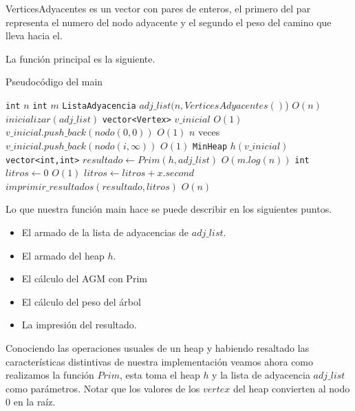 VerticesAdyacentes es un vector con pares de enteros, el primero del par representa el numero del nodo adyacente y el segundo el peso del camino que lleva hacia el.

La función principal es la siguiente.

\begin{algorithm}[H]
  \begin{algorithmic}[1]
  \caption{Pseudocódigo del main}
  \label{algo:2-1}
    	\State \texttt{int} $n$
    	\State \texttt{int} $m$
    	\State \texttt{ListaAdyacencia} $adj\_list(n, VerticesAdyacentes()$)
    	\Comment $O(n)$
	\State $inicializar(adj\_list)$
    	\normalsize
    	\State \texttt{vector<Vertex>} $ v\_inicial$
    	\Comment $O(1)$
    	\State $v\_inicial.push\_back( nodo(0,0) ) $
    	\Comment $O(1)$
    	\Comment $n$ veces
    		\State $v\_inicial.push\_back( nodo(i,\infty) ) $
    		\Comment $O(1)$
    	\EndFor
    	\State \texttt{MinHeap} $h(v\_inicial)$
    	\State \texttt{vector<int,int>} $resultado \gets Prim(h,adj\_list)$
    	\Comment $O(m.log(n))$
    	\State \texttt{int} $litros \gets 0$
    	\Comment $O(1)$
    		\State $litros \gets litros + x.second$
    	\EndFor
	\State $imprimir\_resultados(resultado, litros)$
	\Comment $ O(n) $
		\EndProcedure
  \end{algorithmic}
  \end{algorithm}

Lo que nuestra función main hace se puede describir en los siguientes puntos.

\begin{itemize}
	\item El armado de la lista de adyacencias de $adj\_list$.
	\item El armado del heap $h$.
	\item El cálculo del AGM con Prim
	\item El cálculo del peso del árbol	
	\item La impresión del resultado.
\end{itemize}

Conociendo las operaciones usuales de un heap y habiendo resaltado las características distintivas de nuestra implementación veamos ahora como realizamos la función $Prim$, esta toma el heap $h$ y la lista de adyacencia $adj\_list$ como parámetros. Notar que los valores de los $vertex$ del heap convierten al nodo 0 en la raíz.

